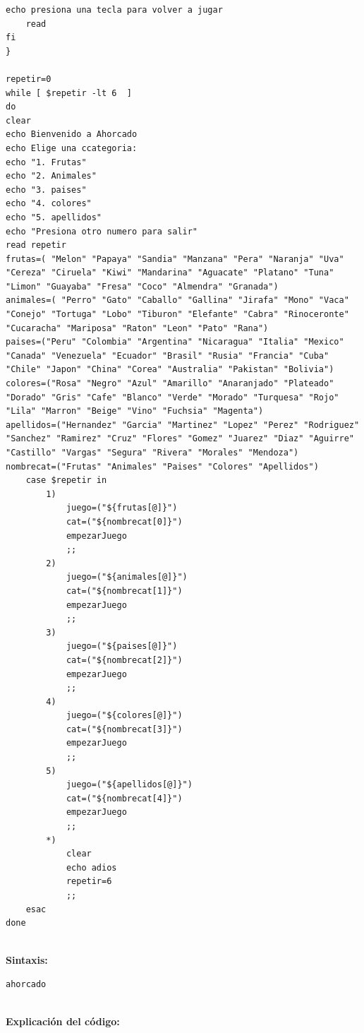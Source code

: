 \documentclass[12pt,a4paper]{article}
\begin{document}
\begin{lstlisting}[style=BashInputStyle]
    echo presiona una tecla para volver a jugar
    read
fi
}

repetir=0
while [ $repetir -lt 6  ]
do
clear
echo Bienvenido a Ahorcado
echo Elige una ccategoria:
echo "1. Frutas"
echo "2. Animales"
echo "3. paises"
echo "4. colores"
echo "5. apellidos"
echo "Presiona otro numero para salir"
read repetir
frutas=( "Melon" "Papaya" "Sandia" "Manzana" "Pera" "Naranja" "Uva" "Cereza" "Ciruela" "Kiwi" "Mandarina" "Aguacate" "Platano" "Tuna" "Limon" "Guayaba" "Fresa" "Coco" "Almendra" "Granada")
animales=( "Perro" "Gato" "Caballo" "Gallina" "Jirafa" "Mono" "Vaca" "Conejo" "Tortuga" "Lobo" "Tiburon" "Elefante" "Cabra" "Rinoceronte" "Cucaracha" "Mariposa" "Raton" "Leon" "Pato" "Rana")
paises=("Peru" "Colombia" "Argentina" "Nicaragua" "Italia" "Mexico" "Canada" "Venezuela" "Ecuador" "Brasil" "Rusia" "Francia" "Cuba" "Chile" "Japon" "China" "Corea" "Australia" "Pakistan" "Bolivia")
colores=("Rosa" "Negro" "Azul" "Amarillo" "Anaranjado" "Plateado" "Dorado" "Gris" "Cafe" "Blanco" "Verde" "Morado" "Turquesa" "Rojo" "Lila" "Marron" "Beige" "Vino" "Fuchsia" "Magenta")
apellidos=("Hernandez" "Garcia" "Martinez" "Lopez" "Perez" "Rodriguez" "Sanchez" "Ramirez" "Cruz" "Flores" "Gomez" "Juarez" "Diaz" "Aguirre" "Castillo" "Vargas" "Segura" "Rivera" "Morales" "Mendoza")
nombrecat=("Frutas" "Animales" "Paises" "Colores" "Apellidos")
	case $repetir in
		1)
		    juego=("${frutas[@]}")
		    cat=("${nombrecat[0]}")
			empezarJuego 
			;;
		2)
		    juego=("${animales[@]}")
		    cat=("${nombrecat[1]}")
			empezarJuego 
			;;
		3)
		    juego=("${paises[@]}")
		    cat=("${nombrecat[2]}")
			empezarJuego 
			;;
		4)
		    juego=("${colores[@]}")
		    cat=("${nombrecat[3]}")
			empezarJuego 
			;;
        5)
            juego=("${apellidos[@]}")
		    cat=("${nombrecat[4]}")
            empezarJuego 
            ;;
        *)
            clear
            echo adios
            repetir=6
            ;;
    esac
done
    \end{lstlisting}
    \\
    \textbf{Sintaxis:}
    \begin{lstlisting}[style=BashInputStyle]
ahorcado
    \end{lstlisting}
    \\
 \textbf{Explicación del código:}\\
\end{document}
